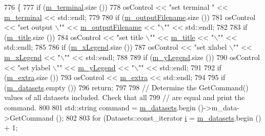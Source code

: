 \begin{DoxyCode}
776 \{
777   \textcolor{keywordflow}{if} (\hyperlink{classns3_1_1Gnuplot_a57041922a660f3a33e8f2f5f75ad9b83}{m\_terminal}.size ())
778     osControl << \textcolor{stringliteral}{"set terminal "} << \hyperlink{classns3_1_1Gnuplot_a57041922a660f3a33e8f2f5f75ad9b83}{m\_terminal} << std::endl;
779 
780   \textcolor{keywordflow}{if} (\hyperlink{classns3_1_1Gnuplot_aa22986d3af73e9b62a6eaadaf1b43763}{m\_outputFilename}.size ())
781     osControl << \textcolor{stringliteral}{"set output \(\backslash\)""} << \hyperlink{classns3_1_1Gnuplot_aa22986d3af73e9b62a6eaadaf1b43763}{m\_outputFilename} << \textcolor{stringliteral}{"\(\backslash\)""} << std::endl;
782 
783   \textcolor{keywordflow}{if} (\hyperlink{classns3_1_1Gnuplot_a7a600dbd860152df160e84b82026ffda}{m\_title}.size ())
784     osControl << \textcolor{stringliteral}{"set title \(\backslash\)""} << \hyperlink{classns3_1_1Gnuplot_a7a600dbd860152df160e84b82026ffda}{m\_title} << \textcolor{stringliteral}{"\(\backslash\)""} << std::endl;
785 
786   \textcolor{keywordflow}{if} (\hyperlink{classns3_1_1Gnuplot_a98f4044a69ababcd17550375e487bdb6}{m\_xLegend}.size ())
787     osControl << \textcolor{stringliteral}{"set xlabel \(\backslash\)""} << \hyperlink{classns3_1_1Gnuplot_a98f4044a69ababcd17550375e487bdb6}{m\_xLegend} << \textcolor{stringliteral}{"\(\backslash\)""} << std::endl;
788 
789   \textcolor{keywordflow}{if} (\hyperlink{classns3_1_1Gnuplot_a2de2eaa271e443b018df1928b19bd707}{m\_yLegend}.size ())
790     osControl << \textcolor{stringliteral}{"set ylabel \(\backslash\)""} << \hyperlink{classns3_1_1Gnuplot_a2de2eaa271e443b018df1928b19bd707}{m\_yLegend} << \textcolor{stringliteral}{"\(\backslash\)""} << std::endl;
791 
792   \textcolor{keywordflow}{if} (\hyperlink{classns3_1_1Gnuplot_a5b88505b31c6b6aeb22f042f6119ac8b}{m\_extra}.size ())
793     osControl << \hyperlink{classns3_1_1Gnuplot_a5b88505b31c6b6aeb22f042f6119ac8b}{m\_extra} << std::endl;
794 
795   \textcolor{keywordflow}{if} (\hyperlink{classns3_1_1Gnuplot_a67150d03c8735e79efa247e27ffd2ab5}{m\_datasets}.empty ())
796     \textcolor{keywordflow}{return};
797 
798   \textcolor{comment}{// Determine the GetCommand() values of all datasets included. Check that all}
799   \textcolor{comment}{// are equal and print the command.}
800 
801   std::string command = \hyperlink{classns3_1_1Gnuplot_a67150d03c8735e79efa247e27ffd2ab5}{m\_datasets}.begin ()->m\_data->GetCommand ();
802 
803   \textcolor{keywordflow}{for} (Datasets::const\_iterator \hyperlink{bernuolliDistribution_8m_a6f6ccfcf58b31cb6412107d9d5281426}{i} = \hyperlink{classns3_1_1Gnuplot_a67150d03c8735e79efa247e27ffd2ab5}{m\_datasets}.begin () + 1;

\end{DoxyCode}
